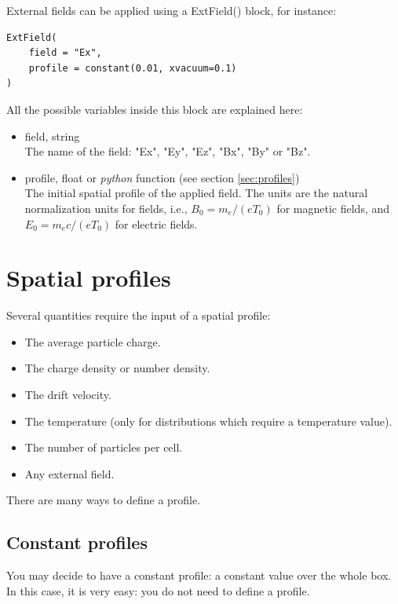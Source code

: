 \documentclass[11pt]{article}
\newcommand{\code}[1]{\colorbox{yellow!15}{\ttfamily #1}}
\newcommand{\python}{\emph{python}\xspace}
\begin{document}
External fields can be applied using a \code{ExtField()} block, for instance:
\begin{lstlisting}
ExtField(
    field = "Ex",
    profile = constant(0.01, xvacuum=0.1)
)
\end{lstlisting}

All the possible variables inside this block are explained here:
\vspace{-10pt}
\begin{itemize}

\item \code{field}, string\\
The name of the field: \code{"Ex"}, \code{"Ey"}, \code{"Ez"}, \code{"Bx"}, \code{"By"} or \code{"Bz"}.

\item \code{profile}, float or \python function (see section \ref{sec:profiles})\\
The initial spatial profile of the applied field. The units are the natural normalization units for fields, i.e., $B_0=m_e /(eT_0)$ for magnetic fields, and $E_0=m_e c/(eT_0)$ for electric fields.

\end{itemize}


\section{Spatial profiles\label{sec:profiles}}

Several quantities require the input of a spatial profile:
\begin{itemize}
\item The average particle charge.
\item The charge density or number density.
\item The drift velocity.
\item The temperature (only for distributions which require a temperature value).
\item The number of particles per cell.
\item Any external field.
\end{itemize}

There are many ways to define a profile.

\subsection{Constant profiles}
You may decide to have a constant profile: a constant value over the whole box.
In this case, it is very easy: you do not need to define a profile.
\end{document}

